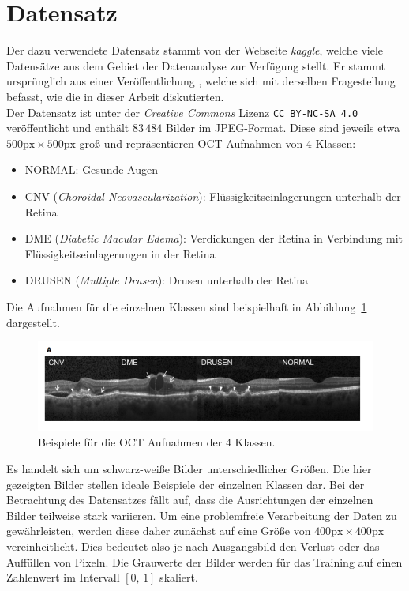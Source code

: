 \section{Datensatz}
%
Der dazu verwendete Datensatz \cite{oct-data} stammt von der Webseite
\textit{kaggle}, welche viele Datensätze aus dem Gebiet der Datenanalyse zur
Verfügung stellt. Er stammt ursprünglich aus einer Veröffentlichung
\cite{paper}, welche sich mit derselben
Fragestellung befasst, wie die in dieser Arbeit diskutierten. \\
Der Datensatz ist unter der \textit{Creative Commons} Lizenz
\texttt{CC BY-NC-SA 4.0} veröffentlicht und enthält $83\,484$ Bilder im
JPEG-Format. Diese sind jeweils etwa $500\text{px}\times500\text{px}$ groß
und repräsentieren OCT-Aufnahmen von 4 Klassen:
%
\begin{itemize}
  \item NORMAL: Gesunde Augen
  \item CNV (\textit{Choroidal Neovascularization}): Flüssigkeitseinlagerungen unterhalb der Retina
  \item DME (\textit{Diabetic Macular Edema}): Verdickungen der Retina in Verbindung mit Flüssigkeitseinlagerungen in der Retina
  \item DRUSEN (\textit{Multiple Drusen}): Drusen unterhalb der Retina
\end{itemize}
%
Die Aufnahmen für die einzelnen Klassen sind beispielhaft in
Abbildung~\ref{fig:scans} dargestellt.
%
\begin{figure}
  \centering
  \includegraphics[width=\textwidth]{Plots/title.png}
  \caption{Beispiele für die OCT Aufnahmen der 4 Klassen.}
  \label{fig:scans}
\end{figure}
%
Es handelt sich um schwarz-weiße Bilder unterschiedlicher Größen. Die hier
gezeigten Bilder stellen ideale Beispiele der einzelnen Klassen dar.
Bei der Betrachtung des Datensatzes fällt auf, dass die Ausrichtungen der
einzelnen Bilder teilweise stark variieren. Um eine problemfreie
Verarbeitung der Daten zu gewährleisten, werden diese daher zunächst auf eine
Größe von $400\text{px}\times400\text{px}$ vereinheitlicht. Dies bedeutet also
je nach Ausgangsbild den Verlust oder das Auffüllen von Pixeln. Die Grauwerte
der Bilder werden für das Training auf einen Zahlenwert im Intervall $[0,\,1]$
skaliert.%
